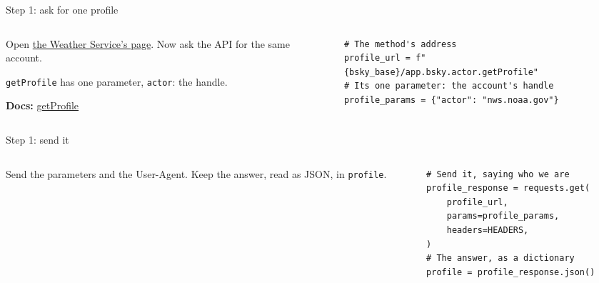 \documentclass[9pt,aspectratio=169]{beamer}
\begin{document}
\begin{frame}[fragile]{Step 1: ask for one profile}
    \begin{columns}[T]
        \begin{column}{0.37\textwidth}
            Open \href{https://bsky.app/profile/nws.noaa.gov}{the Weather Service's page}. Now ask the API for the same account.

            \medskip
            \texttt{getProfile} has one parameter, \texttt{actor}: the handle.

            \medskip
            {\scriptsize\textbf{Docs:} \href{https://endpoints.bsky.app/\#bluesky-app/tag/appbskyactor/GET/xrpc/app.bsky.actor.getProfile}{getProfile}\par}
        \end{column}
        \begin{column}{0.6\textwidth}
\begin{lstlisting}
# The method's address
profile_url = f"{bsky_base}/app.bsky.actor.getProfile"
# Its one parameter: the account's handle
profile_params = {"actor": "nws.noaa.gov"}
\end{lstlisting}
        \end{column}
    \end{columns}
\end{frame}

\begin{frame}[fragile]{Step 1: send it}
    \begin{columns}[T]
        \begin{column}{0.37\textwidth}
            Send the parameters and the User-Agent. Keep the answer, read as JSON, in \texttt{profile}.
        \end{column}
        \begin{column}{0.6\textwidth}
\begin{lstlisting}
# Send it, saying who we are
profile_response = requests.get(
    profile_url,
    params=profile_params,
    headers=HEADERS,
)
# The answer, as a dictionary
profile = profile_response.json()
\end{lstlisting}
        \end{column}
    \end{columns}
\end{frame}
\end{document}
